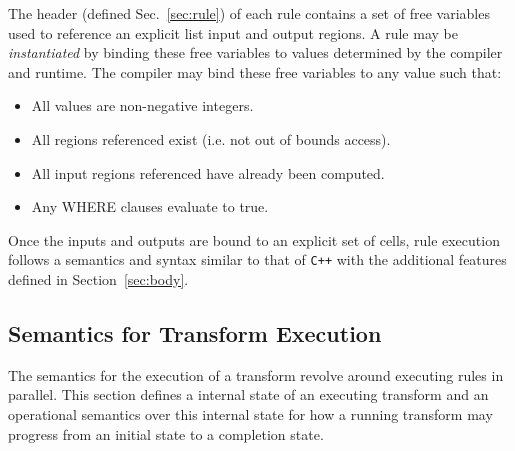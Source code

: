 \documentclass[11pt]{article}
\begin{document}
The header (defined Sec.~\ref{sec:rule}) of each rule contains a set of
free variables used to reference an explicit list input and output regions.
A rule may be {\em instantiated} by binding these free variables to values
determined by the compiler and runtime.  The compiler may bind these free
variables to any value such that:
\begin{itemize}
\item All values are non-negative integers.
\item All regions referenced exist (i.e. not out of bounds access).
\item All input regions referenced have already been computed.
\item Any WHERE clauses evaluate to true.
\end{itemize}

Once the inputs and outputs are bound to an explicit set of cells, rule
execution follows a semantics and syntax similar to that of {\tt C++} with
the additional features defined in Section~\ref{sec:body}.


\subsection{Semantics for Transform Execution}

The semantics for the execution of a transform revolve around executing
rules in parallel.  This section defines a internal state of an executing
transform and an operational semantics over this internal state for how a
running transform may progress from an initial state to a completion state.
\end{document}
